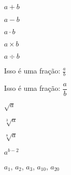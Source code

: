 \documentclass[a4paper, 12pt]{article}
\begin{document}
$a + b$

$a - b$

$a \cdot b$

$a \times b$

$ a \div b$

Isso é uma fração: 
$\frac{a}{b}$

\begin{center}
Isso é uma fração: 
$\dfrac{a}{b}$
\end{center}

$\sqrt{a}$

$\sqrt[3]{a}$

$\sqrt[8]{a}$

$a^{b-2}$

$a_1$, $a_2$, $a_3$, $a_{10}$, $a_{20}$
\end{document}
